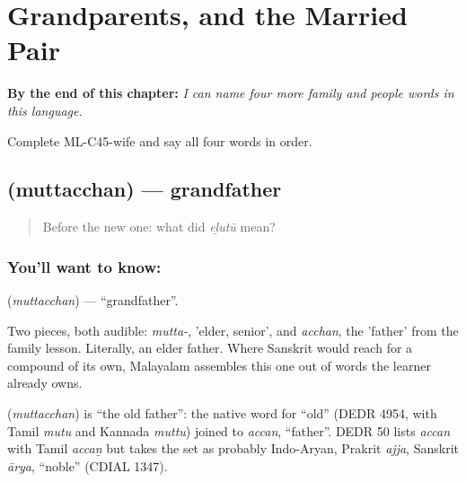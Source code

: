 
\chapter{Grandparents, and the Married Pair}
\label{ch:ml-grandparents}

\begin{chapteropening}
\textbf{By the end of this chapter:} \emph{I can name four more family and people words in this language.}

Complete ML-C45-wife and say all four words in order.
\end{chapteropening}

\section[\texorpdfstring{\ml{മുത്തച്ഛൻ} (muttacchan)}{മുത്തച്ഛൻ (muttacchan)}]{ (muttacchan) — grandfather}

\label{lesson:ML-C45-grandfather}



\begin{quote}
Before the new one: what did \emph{eḻutū} mean?
\end{quote}

\subsection*{You'll want to know: }
\textbf{} (\emph{muttacchan}) — \textquotedblleft{}grandfather\textquotedblright{}.

Two pieces, both audible: \emph{mutta-}, 'elder, senior', and \emph{acchan}, the 'father' from the family lesson. Literally, an elder father. Where Sanskrit would reach for a compound of its own, Malayalam assembles this one out of words the learner already owns.

\begin{cousinweb}
\textbf{} (\emph{muttacchan}) is \textquotedblleft{}the old father\textquotedblright{}: the native word for \textquotedblleft{}old\textquotedblright{} (DEDR 4954, with Tamil \emph{mutu} and Kannada \emph{muttu}) joined to \emph{accan}, \textquotedblleft{}father\textquotedblright{}. DEDR 50 lists \emph{accan} with Tamil \emph{accaṉ} but takes the set as probably Indo-Aryan, Prakrit \emph{ajja}, Sanskrit \emph{ārya}, \textquotedblleft{}noble\textquotedblright{} (CDIAL 1347).
\end{cousinweb}

